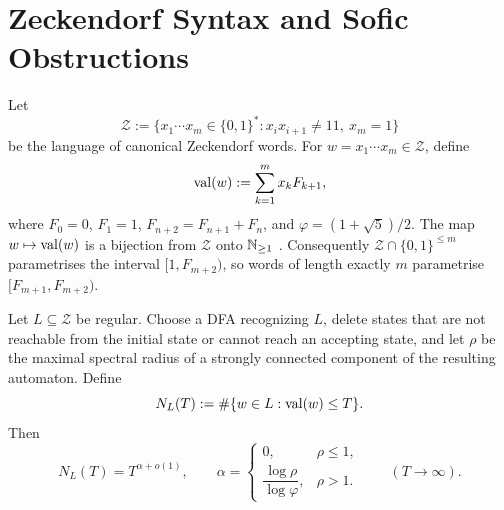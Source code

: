 \section{Zeckendorf Syntax and Sofic Obstructions}
\label{sec:zeckendorf}

Let
\[
  \mathcal Z
  :=\{x_1\cdots x_m\in\{0,1\}^\ast:
      x_ix_{i+1}\neq 11,\ x_m=1\}
\]
be the language of canonical Zeckendorf words. For
\(w=x_1\cdots x_m\in\mathcal Z\), define
\[
  \operatorname{val}(w):=\sum_{k=1}^m x_kF_{k+1},
\]
where \(F_0=0\), \(F_1=1\), \(F_{n+2}=F_{n+1}+F_n\), and
\(\varphi=(1+\sqrt5)/2\). The map \(w\mapsto\operatorname{val}(w)\) is a bijection
from \(\mathcal Z\) onto \(\mathbb{N}_{\ge 1}\) \cite{Zeckendorf1972}.
Consequently \(\mathcal Z\cap\{0,1\}^{\le m}\) parametrises the
interval \([1,F_{m+2})\), so words of length exactly \(m\) parametrise
\([F_{m+1},F_{m+2})\).

\begin{theorem}
  \label{thm:zeckendorf-regular-powerlaw}
  Let \(L\subseteq\mathcal Z\) be regular. Choose a DFA recognizing
  \(L\), delete states that are not reachable from the initial state or
  cannot reach an accepting state, and let \(\rho\) be the maximal
  spectral radius of a strongly connected component of the resulting
  automaton. Define
  \[
    N_L(T):=\#\{w\in L:\operatorname{val}(w)\le T\}.
  \]
  Then
  \[
    N_L(T)=T^{\alpha+o(1)},
    \qquad
    \alpha=
    \begin{cases}
      0, & \rho\le 1,\\[0.3em]
      \dfrac{\log \rho}{\log \varphi}, & \rho>1.
    \end{cases}
    \qquad (T\to\infty).
  \]
\end{theorem}

